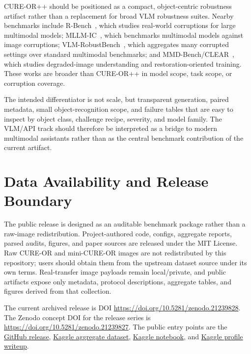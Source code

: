 \documentclass[10pt]{article}
\begin{document}
CURE-OR++ should be positioned as a compact, object-centric robustness artifact rather than a replacement for broad VLM robustness suites. Nearby benchmarks include R-Bench~\cite{rbench}, which studies real-world corruptions for large multimodal models; MLLM-IC~\cite{mllmic}, which benchmarks multimodal models against image corruptions; VLM-RobustBench~\cite{vlmrobustbench}, which aggregates many corrupted settings over standard multimodal benchmarks; and MMD-Bench/CLEAR~\cite{mmdbenchclear}, which studies degraded-image understanding and restoration-oriented training. These works are broader than CURE-OR++ in model scope, task scope, or corruption coverage.

The intended differentiator is not scale, but transparent generation, paired metadata, small object-recognition scope, and failure tables that are easy to inspect by object class, challenge recipe, severity, and model family. The VLM/API track should therefore be interpreted as a bridge to modern multimodal assistants rather than as the central benchmark contribution of the current artifact.

\section{Data Availability and Release Boundary}

The public release is designed as an auditable benchmark package rather than a raw-image redistribution. Project-authored code, configs, aggregate reports, parsed audits, figures, and paper sources are released under the MIT License. Raw CURE-OR and mini-CURE-OR images are not redistributed by this repository; users should obtain them from the upstream dataset source under its own terms. Real-transfer image payloads remain local/private, and public artifacts expose only metadata, protocol descriptions, aggregate tables, and figures derived from that collection.

The current archived release is DOI \url{https://doi.org/10.5281/zenodo.21239828}. The Zenodo concept DOI for the release series is \url{https://doi.org/10.5281/zenodo.21239827}. The public entry points are the \href{https://github.com/qu1nty9/Cure-or-plus-plus/releases/tag/v0.4.1}{GitHub release}, \href{https://www.kaggle.com/datasets/yaroslavkholmirzayev/cure-or-plus-plus-v041-public-flat}{Kaggle aggregate dataset}, \href{https://www.kaggle.com/code/yaroslavkholmirzayev/cure-or-v0-4-1-public-benchmark-writeup}{Kaggle notebook}, and \href{https://www.kaggle.com/writeups/yaroslavkholmirzayev/cure-or-object-recognition-robustness-under-nat}{Kaggle profile writeup}.
\end{document}
